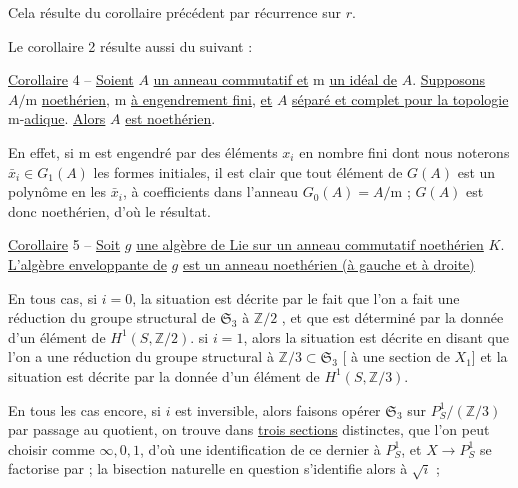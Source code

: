 Cela résulte du corollaire précédent par récurrence sur $r$.

Le corollaire 2 résulte aussi du suivant :

\uline{Corollaire} 4 -- \uline{Soient} $A$ \uline{un anneau commutatif et} $\mathrm m$ \uline{un idéal de} $A$. \uline{Supposons} $A/\mathrm m$ \uline{noethérien}, $\mathrm m$ \uline{à engendrement fini}, \uline{et} $A$ \uline{séparé et complet pour la topologie} $\mathrm m$-\uline{adique}. \uline{Alors} $A$ \uline{est noethérien}.

En effet, si $\mathrm m$ est engendré par des éléments $x_i$ en nombre fini dont nous noterons $\bar x_i\in G_1(A)$ les formes initiales, il est clair que tout élément de $G(A)$ est un polynôme en les $\bar x_i$, à coefficients dans l'anneau $G_0(A)=A/\mathrm m$ ; $G(A)$ est donc noethérien, d'où le résultat.

\uline{Corollaire} 5 -- \uline{Soit} $g$ \uline{une algèbre de Lie sur un anneau commutatif noethérien} $K$. \uline{L'algèbre enveloppante de} $g$ \uline{est un anneau noethérien (à gauche et à droite)}


En tous cas, si $i=0$, la situation est décrite par le fait que l'on a fait une réduction du groupe structural de $\mathfrak S_3$ à $\mathbb Z/2$ , et que  est déterminé par la donnée d'un élément de $H^1(S,\mathbb Z/2)$.   si $i=1$, alors la situation est décrite en disant que l'on a une réduction du groupe structural à $\mathbb Z/3\subset\mathfrak S_3$ [ à une section de  $X_1$] et la situation est décrite par la donnée d'un élément de $H^1(S,\mathbb Z/3)$.


 En tous les cas encore, si $i$ est inversible, alors faisons opérer $\mathfrak S_3$ sur $P^1_S/(\mathbb Z/3)$ par passage au quotient, on trouve dans    \uline{trois sections} distinctes,  que l'on peut choisir comme $\infty,0,1$, d'où une identification de ce dernier à $P^1_S$, et $X\longrightarrow P^1_S$ se factorise par
; la bisection naturelle en question s'identifie alors à $\sqrt i$ ;

